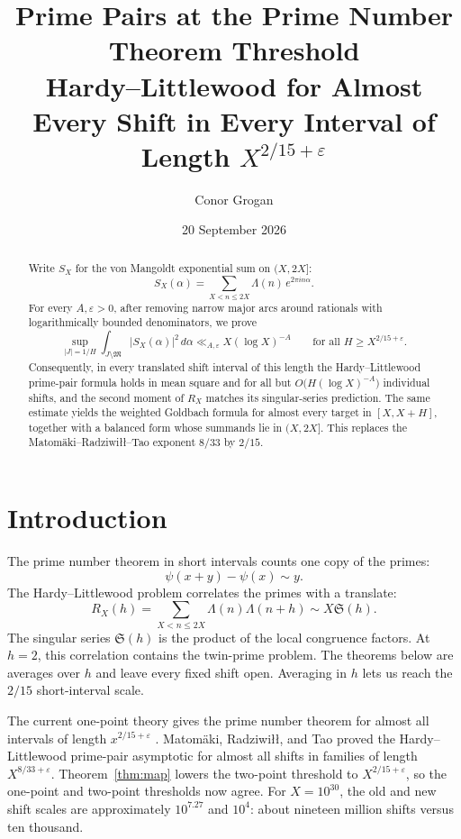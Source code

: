 \documentclass[11pt]{article}
\title{Prime Pairs at the Prime Number Theorem Threshold\\
\large Hardy--Littlewood for Almost Every Shift in Every
Interval of Length $X^{2/15+\varepsilon}$}
\author{Conor Grogan}
\date{20 September 2026}
\theoremstyle{remark}
\newcommand{\eps}{\varepsilon}
\newcommand{\1}{\mathbf 1}
\begin{document}
\maketitle

\begin{abstract}
Write \(S_X\) for the von Mangoldt exponential sum on \((X,2X]\):
\[
 S_X(\alpha)=\sum_{X<n\le 2X}\Lambda(n)\,e^{2\pi i n\alpha}.
\]
For every \(A,\eps>0\), after removing narrow major arcs around rationals
with logarithmically bounded denominators, we prove
\[
 \sup_{|J|=1/H}\int_{J\setminus\mathfrak M}|S_X(\alpha)|^2\,d\alpha
 \ll_{A,\eps}X(\log X)^{-A}
 \qquad\text{for all }H\ge X^{2/15+\eps}.
\]
Consequently, in every translated shift interval of this length the
Hardy--Littlewood prime-pair formula holds in mean square and for all but
\(O\bigl(H(\log X)^{-A}\bigr)\) individual shifts, and the second moment of
\(R_X\) matches its singular-series prediction.  The same estimate yields
the weighted Goldbach formula for almost every target in \([X,X+H]\),
together with a balanced form whose summands lie in \((X,2X]\).  This
replaces the Matom\"aki--Radziwi\l\l--Tao exponent \(8/33\) by \(2/15\).
\end{abstract}

\section*{Introduction}
The prime number theorem in short intervals counts one copy of the primes:
\[
 \psi(x+y)-\psi(x)\sim y.
\]
The Hardy--Littlewood problem correlates the primes with a translate:
\[
 R_X(h)=\sum_{X<n\le2X}\Lambda(n)\Lambda(n+h)
 \sim X\mathfrak S(h).
\]
The singular series \(\mathfrak S(h)\) is the product of the local congruence
factors.  At \(h=2\), this correlation contains the twin-prime problem.
The theorems below are averages over \(h\) and leave every fixed shift open.
Averaging in \(h\) lets us reach the \(2/15\) short-interval scale.

The current one-point theory gives the prime number theorem for almost all
intervals of length \(x^{2/15+\eps}\) \cite{GafniTao2026}.  Matom\"aki,
Radziwi\l\l, and Tao \cite{MRT2019} proved the Hardy--Littlewood prime-pair
asymptotic for almost all shifts in families of length
\(X^{8/33+\eps}\).  Theorem~\ref{thm:map} lowers the two-point threshold to
\(X^{2/15+\eps}\), so the one-point and two-point thresholds now agree.
For \(X=10^{30}\), the old and new shift scales are approximately
\(10^{7.27}\) and \(10^4\): about nineteen million shifts versus ten
thousand.
\end{document}
